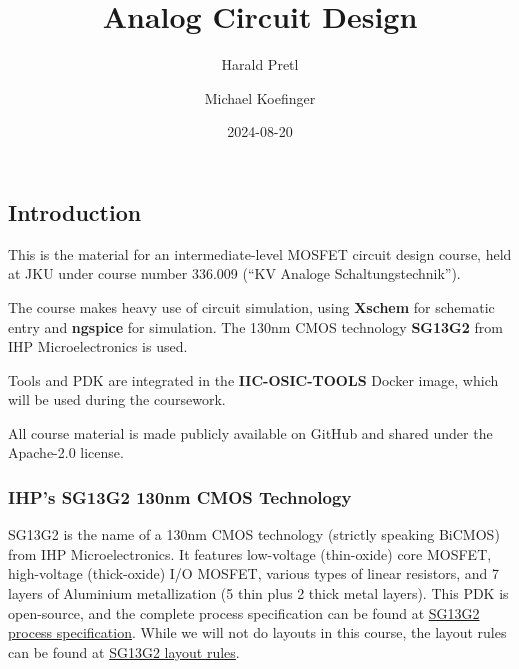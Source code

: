 \documentclass[
  a4paper,
  DIV=11,
  numbers=noendperiod]{scrartcl}
\title{Analog Circuit Design}
\author{Harald Pretl \and Michael Koefinger}
\date{2024-08-20}
\renewcommand*\contentsname{Table of contents}
\newcommand\contentsname{Table of contents}
\begin{document}
\maketitle

\renewcommand*\contentsname{Table of contents}
{
\hypersetup{linkcolor=}
\setcounter{tocdepth}{3}
\tableofcontents
}

\subsection{Introduction}\label{sec-intro}

This is the material for an intermediate-level MOSFET circuit design
course, held at JKU under course number 336.009 (``KV Analoge
Schaltungstechnik'').

The course makes heavy use of circuit simulation, using \textbf{Xschem}
for schematic entry and \textbf{ngspice} for simulation. The 130nm CMOS
technology \textbf{SG13G2} from IHP Microelectronics is used.

Tools and PDK are integrated in the \textbf{IIC-OSIC-TOOLS} Docker
image, which will be used during the coursework.

\begin{tcolorbox}[enhanced jigsaw, colframe=quarto-callout-note-color-frame, opacityback=0, breakable, toptitle=1mm, left=2mm, rightrule=.15mm, titlerule=0mm, arc=.35mm, toprule=.15mm, bottomrule=.15mm, colbacktitle=quarto-callout-note-color!10!white, bottomtitle=1mm, colback=white, title=\textcolor{quarto-callout-note-color}{\faInfo}\hspace{0.5em}{Note}, coltitle=black, leftrule=.75mm, opacitybacktitle=0.6]

All course material is made publicly available on GitHub and shared
under the Apache-2.0 license.

\end{tcolorbox}

\subsubsection{IHP's SG13G2 130nm CMOS
Technology}\label{ihps-sg13g2-130nm-cmos-technology}

SG13G2 is the name of a 130nm CMOS technology (strictly speaking BiCMOS)
from IHP Microelectronics. It features low-voltage (thin-oxide) core
MOSFET, high-voltage (thick-oxide) I/O MOSFET, various types of linear
resistors, and 7 layers of Aluminium metallization (5 thin plus 2 thick
metal layers). This PDK is open-source, and the complete process
specification can be found at
\href{https://github.com/IHP-GmbH/IHP-Open-PDK/blob/main/ihp-sg13g2/libs.doc/doc/SG13G2_os_process_spec.pdf}{SG13G2
process specification}. While we will not do layouts in this course, the
layout rules can be found at
\href{https://github.com/IHP-GmbH/IHP-Open-PDK/blob/main/ihp-sg13g2/libs.doc/doc/SG13G2_os_layout_rules.pdf}{SG13G2
layout rules}.
\end{document}
